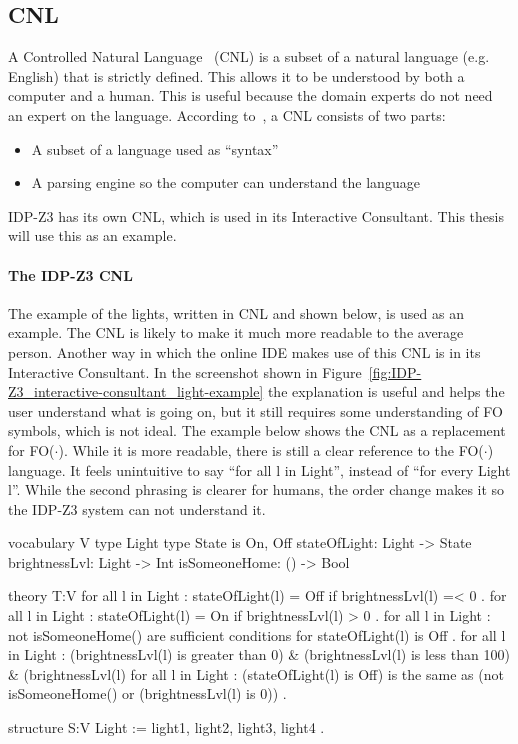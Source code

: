 \documentclass[11pt,a4paper]{report}
\newcommand{\fodot}{FO($\cdot$)\xspace}
\begin{document}
\subsection{CNL}
\label{CNL}
A Controlled Natural Language~\cite{CNL} (CNL) is a subset of a natural language (e.g. English) that is strictly defined. This allows it to be understood by both a computer and a human. This is useful because the domain experts do not need an expert on the language. According to~\cite{CNLAttemptoControlledEnglish}, a CNL consists of two parts:
 \begin{itemize}
 	\item A subset of a language used as ``syntax'' 
     \item A parsing engine so the computer can understand the language
 \end{itemize}
 IDP-Z3 has its own CNL, which is used in its Interactive Consultant. This thesis will use this as an example.

\paragraph{The IDP-Z3 CNL}
The example of the lights, written in CNL and shown below, is used as an example. The CNL is likely to make it much more readable to the average person. Another way in which the online IDE makes use of this CNL is in its Interactive Consultant. In the screenshot shown in Figure~\ref{fig:IDP-Z3_interactive-consultant_light-example} the explanation is useful and helps the user understand what is going on, but it still requires some understanding of FO symbols, which is not ideal.
The example below shows the CNL as a replacement for \fodot. While it is more readable, there is still a clear reference to the \fodot language. It feels unintuitive to say ``for all l in Light'', instead of ``for every Light l''. While the second phrasing is clearer for humans, the order change makes it so the IDP-Z3 system can not understand it.

\begin{idplisting}
    vocabulary V {
        type Light
        type State is {On, Off}
        stateOfLight: Light -> State
        brightnessLvl: Light -> Int
        isSomeoneHome: () -> Bool
    }

    theory T:V {
        {
            for all l in Light : stateOfLight(l) = Off if brightnessLvl(l) =< 0 .
            for all l in Light : stateOfLight(l) = On if brightnessLvl(l) > 0 .
        }
        for all l in Light : not isSomeoneHome() are sufficient conditions for stateOfLight(l) is Off .
        for all l in Light : (brightnessLvl(l) is greater than 0) & (brightnessLvl(l) is less than 100) & (brightnessLvl(l) %
        for all l in Light : (stateOfLight(l) is Off) is the same as (not isSomeoneHome() or (brightnessLvl(l) is 0)) .
    }

    structure S:V {
        Light := {light1, light2, light3, light4} .
    }
\end{idplisting}
\end{document}
